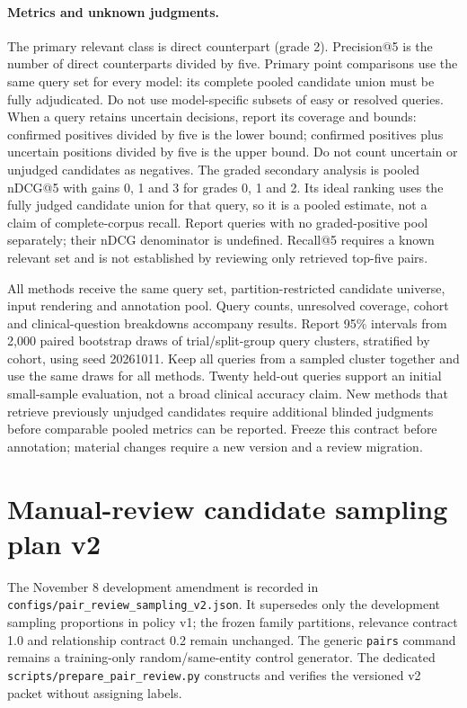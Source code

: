 \documentclass[10pt,letterpaper]{article}
\newcommand{\pathcode}[1]{\nolinkurl{#1}}
\begin{document}
\paragraph{Metrics and unknown judgments.}
The primary relevant class is direct counterpart (grade 2). Precision@5 is the
number of direct counterparts divided by five. Primary point comparisons use
the same query set for every model: its complete pooled candidate union must
be fully adjudicated. Do not use model-specific subsets of easy or resolved queries.
When a query retains uncertain decisions, report its coverage and bounds:
confirmed positives divided by five is the lower bound; confirmed positives
plus uncertain positions divided by five is the upper bound. Do not count
uncertain or unjudged candidates as negatives. The graded secondary analysis
is pooled nDCG@5 with gains 0, 1 and 3 for grades 0, 1 and 2. Its ideal ranking
uses the fully judged candidate union for that query, so it is a pooled estimate,
not a claim of complete-corpus recall. Report queries with no graded-positive
pool separately; their nDCG denominator is undefined. Recall@5 requires a known
relevant set and is not established by reviewing only retrieved top-five pairs.

All methods receive the same query set, partition-restricted candidate universe,
input rendering and annotation pool. Query counts, unresolved coverage, cohort
and clinical-question breakdowns accompany results. Report 95\% intervals from 2,000 paired bootstrap draws of trial/split-group
query clusters, stratified by cohort, using seed 20261011. Keep all queries from
a sampled cluster together and use the same draws for all methods. Twenty
held-out queries support an initial small-sample evaluation, not a broad
clinical accuracy claim. New methods that
retrieve previously unjudged candidates require additional blinded judgments
before comparable pooled metrics can be reported. Freeze this contract before
annotation; material changes require a new version and a review migration.

\section{Manual-review candidate sampling plan v2}\label{sec:reviewsampling}
The November 8 development amendment is recorded in
\pathcode{configs/pair_review_sampling_v2.json}. It supersedes only the
development sampling proportions in policy v1; the frozen family partitions,
relevance contract 1.0 and relationship contract 0.2 remain unchanged. The
generic \pathcode{pairs} command remains a training-only random/same-entity
control generator. The dedicated \pathcode{scripts/prepare_pair_review.py}
constructs and verifies the versioned v2 packet without assigning labels.
\end{document}

